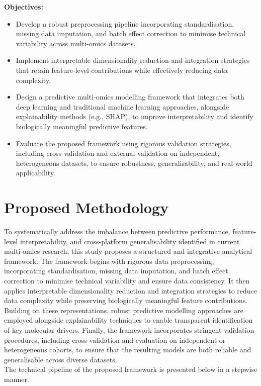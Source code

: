 \documentclass[conference]{IEEEtran}
\begin{document}
\textbf{Objectives:}
\begin{itemize}
    \item Develop a robust preprocessing pipeline incorporating standardisation, missing data imputation, and batch effect correction to minimise technical variability across multi-omics datasets.
    \item Implement interpretable dimensionality reduction and integration strategies that retain feature-level contributions while effectively reducing data complexity.
    \item Design a predictive multi-omics modelling framework that integrates both deep learning and traditional machine learning approaches, alongside explainability methods (e.g., SHAP), to improve interpretability and identify biologically meaningful predictive features.
    \item Evaluate the proposed framework using rigorous validation strategies, including cross-validation and external validation on independent, heterogeneous datasets, to ensure robustness, generalisability, and real-world applicability.
\end{itemize}

\section{Proposed Methodology}
To systematically address the imbalance between predictive performance, feature-level interpretability, and cross-platform generalisability identified in current multi-omics research, this study proposes a structured and integrative analytical framework. The framework begins with rigorous data preprocessing, incorporating standardisation, missing data imputation, and batch effect correction to minimise technical variability and ensure data consistency. It then applies interpretable dimensionality reduction and integration strategies to reduce data complexity while preserving biologically meaningful feature contributions. Building on these representations, robust predictive modelling approaches are employed alongside explainability techniques to enable transparent identification of key molecular drivers. Finally, the framework incorporates stringent validation procedures, including cross-validation and evaluation on independent or heterogeneous cohorts, to ensure that the resulting models are both reliable and generalisable across diverse datasets.\\
The technical pipeline of the proposed framework is presented below in a stepwise manner.
\end{document}

